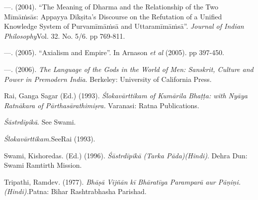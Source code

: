 \begin{thebibliography}{99}
  —. (2004). “The Meaning of Dharma and the Relationship of the Two Mīmāṁsās: Appayya Dīkṣita’s Discourse on the Refutation of a Unified Knowledge System of Purvamīmāṁsā and Uttaramīmāṁsā”. \textit{Journal of Indian Philosophy}Vol. 32. No. 5/6. pp 769-811. 

  —. (2005). “Axialism and Empire”. In Arnason \textit{et al} (2005). pp 397-450.

  —. (2006). \textit{The Language of the Gods in the World of Men: Sanskrit, Culture and Power in Premodern India}. Berkeley: University of California Press.

  Rai, Ganga Sagar (Ed.) (1993). \textit{Ślokavārttikam of Kumārila Bhaṭṭa: with Nyāya Ratnākara of Pārthasārathimiṣra.} Varanasi: Ratna Publications.

  \textit{Śāstrdīpikā}. See Swami.

  \textit{Ślokavārttikam.}SeeRai (1993).

  Swami, Kishoredas. (Ed.) (1996). \textit{Śāstrdīpikā (Tarka Pāda)(Hindi)}. Dehra Dun: Swami Ramtirth Mission.

  Tripathi, Ramdev. (1977). \textit{Bhāṣā Vijñān kī Bhāratīya Paramparā aur Pāṇiṇi. (Hindi).}Patna: Bihar Rashtrabhasha Parishad.

 \end{thebibliography}

